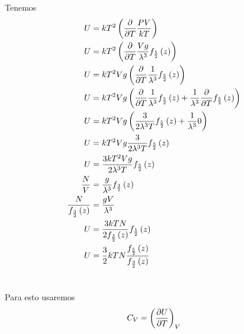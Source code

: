 \documentclass{report}
\begin{document}
\section{}

Tenemos
\begin{align*}
  U &= kT^2 \left(\frac{\partial}{\partial T}\frac{PV}{kT}\right)\\
  U &= kT^2 \left(\frac{\partial}{\partial T}\frac{Vg}{\lambda^3}f_{\frac{5}{2}}\left(z\right)\right)\\
  U &= kT^2Vg \left(\frac{\partial}{\partial T}\frac{1}{\lambda^3}f_{\frac{5}{2}}\left(z\right)\right)\\
  U &= kT^2Vg \left(\frac{\partial}{\partial T}\frac{1}{\lambda^3}f_{\frac{5}{2}}\left(z\right) + \frac{1}{\lambda^3}\frac{\partial}{\partial T}f_{\frac{5}{2}}\left(z\right)\right)\\
  U &= kT^2Vg \left(\frac{3}{2\lambda^3T}f_{\frac{5}{2}}\left(z\right) + \frac{1}{\lambda^3}0\right)\\
  U &= kT^2Vg \frac{3}{2\lambda^3T}f_{\frac{5}{2}}\left(z\right)\\
  U &= \frac{3kT^2Vg}{2\lambda^3T}f_{\frac{5}{2}}\left(z\right)\\
  \frac{N}{V} &= \frac{g}{\lambda^3} f_{\frac{3}{2}}\left(z\right)\\
  \frac{N}{f_{\frac{3}{2}}\left(z\right)} &= \frac{gV}{\lambda^3}\\
  U &= \frac{3kT N}{2f_{\frac{3}{2}}\left(z\right)}f_{\frac{5}{2}}\left(z\right)\\
  U &= \frac{3}{2}kT N\frac{f_{\frac{5}{2}}\left(z\right)}{f_{\frac{3}{2}}\left(z\right)}\\
\end{align*}

\section{}

Para esto usaremos
\[
  C_V = \left(\frac{\partial U}{\partial T}\right)_{V}
\]
\end{document}
